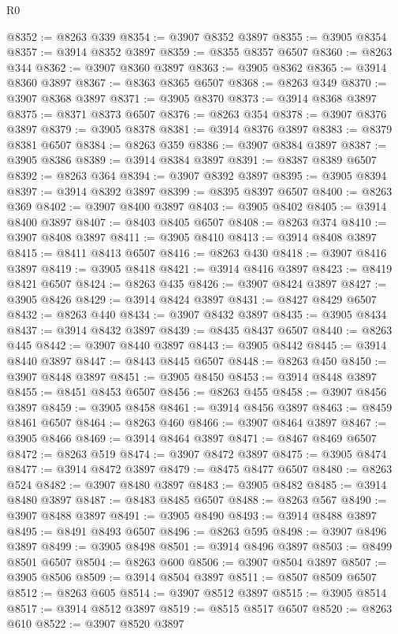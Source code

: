 \begin{lexlean}{R0}
\begin{coremodule}
@8352 := @8263 @339
@8354 := @3907 @8352 @3897
@8355 := @3905 @8354
@8357 := @3914 @8352 @3897
@8359 := @8355 @8357 @6507
@8360 := @8263 @344
@8362 := @3907 @8360 @3897
@8363 := @3905 @8362
@8365 := @3914 @8360 @3897
@8367 := @8363 @8365 @6507
@8368 := @8263 @349
@8370 := @3907 @8368 @3897
@8371 := @3905 @8370
@8373 := @3914 @8368 @3897
@8375 := @8371 @8373 @6507
@8376 := @8263 @354
@8378 := @3907 @8376 @3897
@8379 := @3905 @8378
@8381 := @3914 @8376 @3897
@8383 := @8379 @8381 @6507
@8384 := @8263 @359
@8386 := @3907 @8384 @3897
@8387 := @3905 @8386
@8389 := @3914 @8384 @3897
@8391 := @8387 @8389 @6507
@8392 := @8263 @364
@8394 := @3907 @8392 @3897
@8395 := @3905 @8394
@8397 := @3914 @8392 @3897
@8399 := @8395 @8397 @6507
@8400 := @8263 @369
@8402 := @3907 @8400 @3897
@8403 := @3905 @8402
@8405 := @3914 @8400 @3897
@8407 := @8403 @8405 @6507
@8408 := @8263 @374
@8410 := @3907 @8408 @3897
@8411 := @3905 @8410
@8413 := @3914 @8408 @3897
@8415 := @8411 @8413 @6507
@8416 := @8263 @430
@8418 := @3907 @8416 @3897
@8419 := @3905 @8418
@8421 := @3914 @8416 @3897
@8423 := @8419 @8421 @6507
@8424 := @8263 @435
@8426 := @3907 @8424 @3897
@8427 := @3905 @8426
@8429 := @3914 @8424 @3897
@8431 := @8427 @8429 @6507
@8432 := @8263 @440
@8434 := @3907 @8432 @3897
@8435 := @3905 @8434
@8437 := @3914 @8432 @3897
@8439 := @8435 @8437 @6507
@8440 := @8263 @445
@8442 := @3907 @8440 @3897
@8443 := @3905 @8442
@8445 := @3914 @8440 @3897
@8447 := @8443 @8445 @6507
@8448 := @8263 @450
@8450 := @3907 @8448 @3897
@8451 := @3905 @8450
@8453 := @3914 @8448 @3897
@8455 := @8451 @8453 @6507
@8456 := @8263 @455
@8458 := @3907 @8456 @3897
@8459 := @3905 @8458
@8461 := @3914 @8456 @3897
@8463 := @8459 @8461 @6507
@8464 := @8263 @460
@8466 := @3907 @8464 @3897
@8467 := @3905 @8466
@8469 := @3914 @8464 @3897
@8471 := @8467 @8469 @6507
@8472 := @8263 @519
@8474 := @3907 @8472 @3897
@8475 := @3905 @8474
@8477 := @3914 @8472 @3897
@8479 := @8475 @8477 @6507
@8480 := @8263 @524
@8482 := @3907 @8480 @3897
@8483 := @3905 @8482
@8485 := @3914 @8480 @3897
@8487 := @8483 @8485 @6507
@8488 := @8263 @567
@8490 := @3907 @8488 @3897
@8491 := @3905 @8490
@8493 := @3914 @8488 @3897
@8495 := @8491 @8493 @6507
@8496 := @8263 @595
@8498 := @3907 @8496 @3897
@8499 := @3905 @8498
@8501 := @3914 @8496 @3897
@8503 := @8499 @8501 @6507
@8504 := @8263 @600
@8506 := @3907 @8504 @3897
@8507 := @3905 @8506
@8509 := @3914 @8504 @3897
@8511 := @8507 @8509 @6507
@8512 := @8263 @605
@8514 := @3907 @8512 @3897
@8515 := @3905 @8514
@8517 := @3914 @8512 @3897
@8519 := @8515 @8517 @6507
@8520 := @8263 @610
@8522 := @3907 @8520 @3897

\end{coremodule}
\end{lexlean}
